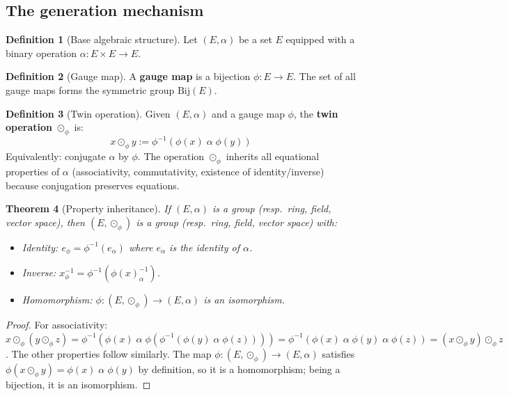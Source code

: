 \documentclass[12pt]{article}
\theoremstyle{plain}
\newtheorem{theorem}{Theorem}[section]
\theoremstyle{definition}
\newtheorem{definition}[theorem]{Definition}
\theoremstyle{remark}
\begin{document}
\subsection{The generation mechanism}

\begin{definition}[Base algebraic structure]\label{def:base}
Let $(E, \alpha)$ be a set $E$ equipped with a binary operation $\alpha: E \times E \to E$.
\end{definition}

\begin{definition}[Gauge map]\label{def:gauge}
A \textbf{gauge map} is a bijection $\phi: E \to E$. The set of all gauge maps forms the symmetric group $\mathrm{Bij}(E)$.
\end{definition}

\begin{definition}[Twin operation]\label{def:twin-op}
Given $(E, \alpha)$ and a gauge map $\phi$, the \textbf{twin operation} $\odot_\phi$ is:
\begin{equation}\label{eq:twin-def}
\boxed{x \odot_\phi y := \phi^{-1}(\phi(x) \;\alpha\; \phi(y))}
\end{equation}
Equivalently: conjugate $\alpha$ by $\phi$. The operation $\odot_\phi$ inherits all equational properties of $\alpha$ (associativity, commutativity, existence of identity/inverse) because conjugation preserves equations.
\end{definition}

\begin{theorem}[Property inheritance]\label{thm:inheritance}
If $(E, \alpha)$ is a group (resp.\ ring, field, vector space), then $(E, \odot_\phi)$ is a group (resp.\ ring, field, vector space) with:
\begin{itemize}
    \item Identity: $e_\phi = \phi^{-1}(e_\alpha)$ where $e_\alpha$ is the identity of $\alpha$.
    \item Inverse: $x^{-1}_\phi = \phi^{-1}(\phi(x)^{-1}_\alpha)$.
    \item Homomorphism: $\phi: (E, \odot_\phi) \to (E, \alpha)$ is an isomorphism.
\end{itemize}
\end{theorem}

\begin{proof}
For associativity: $x \odot_\phi (y \odot_\phi z) = \phi^{-1}(\phi(x) \;\alpha\; \phi(\phi^{-1}(\phi(y) \;\alpha\; \phi(z)))) = \phi^{-1}(\phi(x) \;\alpha\; \phi(y) \;\alpha\; \phi(z)) = (x \odot_\phi y) \odot_\phi z$. The other properties follow similarly. The map $\phi: (E, \odot_\phi) \to (E, \alpha)$ satisfies $\phi(x \odot_\phi y) = \phi(x) \;\alpha\; \phi(y)$ by definition, so it is a homomorphism; being a bijection, it is an isomorphism.
\end{proof}
\end{document}
